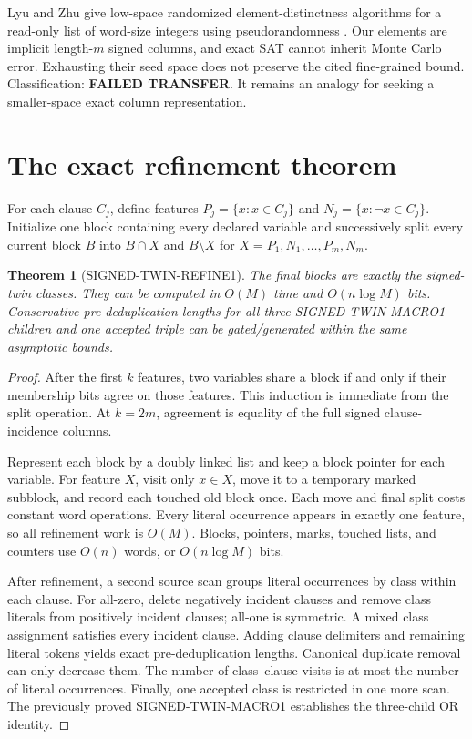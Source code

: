 \documentclass[11pt]{article}
\newtheorem{theorem}{Theorem}
\begin{document}
Lyu and Zhu give low-space randomized element-distinctness algorithms for a
read-only list of word-size integers using pseudorandomness
\cite{arc0009LyuZhu}.  Our elements are implicit length-$m$ signed columns,
and exact SAT cannot inherit Monte Carlo error.  Exhausting their seed space
does not preserve the cited fine-grained bound.  Classification:
\textbf{FAILED TRANSFER}.  It remains an analogy for seeking a smaller-space
exact column representation.

\section{The exact refinement theorem}
For each clause $C_j$, define features
$P_j=\{x:x\in C_j\}$ and $N_j=\{x:\neg x\in C_j\}$.  Initialize one block
containing every declared variable and successively split every current block
$B$ into $B\cap X$ and $B\setminus X$ for
$X=P_1,N_1,\ldots,P_m,N_m$.

\begin{theorem}[SIGNED-TWIN-REFINE1]
The final blocks are exactly the signed-twin classes.  They can be computed
in $O(M)$ time and $O(n\log M)$ bits.  Conservative pre-deduplication lengths
for all three SIGNED-TWIN-MACRO1 children and one accepted triple can be
gated/generated within the same asymptotic bounds.
\end{theorem}
\begin{proof}
After the first $k$ features, two variables share a block if and only if their
membership bits agree on those features.  This induction is immediate from
the split operation.  At $k=2m$, agreement is equality of the full signed
clause-incidence columns.

Represent each block by a doubly linked list and keep a block pointer for
each variable.  For feature $X$, visit only $x\in X$, move it to a temporary
marked subblock, and record each touched old block once.  Each move and final
split costs constant word operations.  Every literal occurrence appears in
exactly one feature, so all refinement work is $O(M)$.  Blocks, pointers,
marks, touched lists, and counters use $O(n)$ words, or $O(n\log M)$ bits.

After refinement, a second source scan groups literal occurrences by class
within each clause.  For all-zero, delete negatively incident clauses and
remove class literals from positively incident clauses; all-one is symmetric.
A mixed class assignment satisfies every incident clause.  Adding clause
delimiters and remaining literal tokens yields exact pre-deduplication
lengths.  Canonical duplicate removal can only decrease them.  The number of
class--clause visits is at most the number of literal occurrences.  Finally,
one accepted class is restricted in one more scan.  The previously proved
SIGNED-TWIN-MACRO1 establishes the three-child OR identity.
\end{proof}
\end{document}
